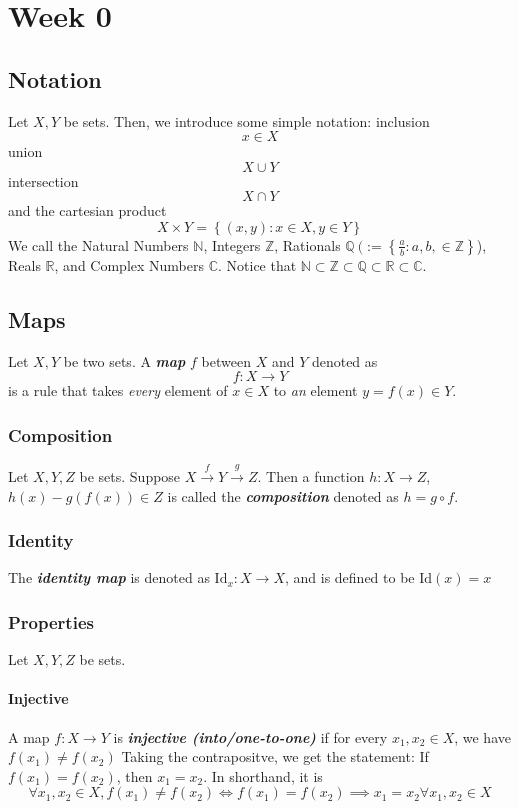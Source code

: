 \documentclass{report}
\newcommand{\Z}{\mathbb{Z}}
\newcommand{\N}{\mathbb{N}}
\newcommand{\textib}[1]{\textit{\textbf{{#1}}}}
\newcommand{\Id}{\text{Id}}
\begin{document}
\tableofcontents
\newpage

\chapter{Week 0}
\section{Notation}
Let $X, Y$ be sets. Then, we introduce some simple notation:
inclusion 
\[x \in X\]
union 
\[X \cup Y\]
intersection
\[X \cap Y\]
and the cartesian product 
\[X \times Y = \left\{ (x, y) : x \in X, y \in Y \right\}\]
\newline
We call the Natural Numbers $\N$, Integers $\Z$, Rationals 
$\mathbb{Q} \ (:= \left\{ \frac{a}{b} : a, b, \in  \Z \right\}$), Reals $\mathbb{R}$, 
and Complex Numbers $\mathbb{C}$. Notice that 
$\N \subset \Z \subset \mathbb{Q} \subset \mathbb{R} \subset \mathbb{C}$.



\section{Maps}
Let $X, Y$ be two sets. A \textib{map} $f$ between $X$ and $Y$ denoted as
\[f : X \to Y\]
is a rule that takes \textit{every} element of $x \in X$ to \textit{an} element $y = f(x) \in Y$.


\subsection{Composition}
Let $X, Y, Z$ be sets. Suppose $X \stackrel{f}{\to} Y \stackrel{g}{\to} Z$. Then a function
$h : X \to Z$, $h(x) - g(f(x)) \in Z$ is called the \textib{composition} denoted as $h = g \circ f$.


\subsection{Identity}
The \textib{identity map} is denoted as $\Id_x : X \to X$, and is defined to be $\Id(x) = x$


\subsection{Properties}
Let $X, Y, Z$ be sets.
\subsubsection{Injective}
A map $f : X \to Y$ is \textib{injective (into/one-to-one)} if for every $x_1, x_2 \in X$, we have
$f(x_1) \neq f(x_2)$ Taking the contrapositve, we get the statement: 
If $f(x_1) = f(x_2)$, then $x_1 = x_2$. In shorthand, it is
\[\forall x_1, x_2 \in X, f(x_1) \neq f(x_2) \iff f(x_1) = f(x_2) \implies x_1 = x_2 \forall x_1, x_2 \in X\]
\end{document}
